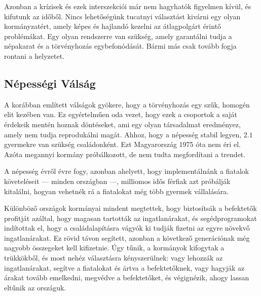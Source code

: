 Azonban a krízisek és ezek interszekciói már nem hagyhatók figyelmen kívül, és kifutunk az
időből. Nincs lehetőségünk tucatnyi választást kivárni egy olyan kormányzatért, amely
képes és hajlandó kezelni az átlagpolgárt érintő problémákat. Egy olyan rendszerre van
szükség, amely garantálni tudja a népakarat és a törvényhozás egybefonódását. Bármi
más csak tovább fogja rontani a helyzetet.


\subsection{Népességi Válság}

A korábban említett válságok gyökere, hogy a törvényhozás egy szűk, homogén elit
kezében van. Ez egyértelműen oda vezet, hogy ezek a csoportok a saját érdekeik mentén
hoznak döntéseket, ami egy olyan társadalmat eredményez, amely nem tudja reprodukálni
magát. Ahhoz, hogy a népesség stabil legyen, \(2.1\) gyermekre van szükség családonként.
Ezt Magyarország 1975 óta nem éri el. Azóta megannyi kormány próbálkozott, de nem tudta
megfordítani a trendet.

A népesség évről évre fogy, azonban ahelyett, hogy implementálnánk a fiatalok követeléseit
--- minden országban ---, milliomos idős férfiak azt próbálják kitalálni, hogyan vehetnék
rá a fiatalokat még több gyermek vállalására.

Különböző országok kormányai mindent megtettek, hogy biztosítsák a befektetők profitját
azáltal, hogy magasan tartották az ingatlanárakat, és segédprogramokat indítottak el,
hogy a családalapításra vágyók ki tudják fizetni az egyre növekvő ingatlanárakat. Ez
rövid távon segített, azonban a következő generációnak még nagyobb összegeket kell
kifizetnie. Úgy tűnik, a kormányok kifogytak a trükkökből, és most nehéz választásra
kényszerülnek: vagy lehozzák az ingatlanárakat, segítve a fiatalokat és ártva a
befektetőknek, vagy hagyják az árakat tovább emelkedni, megvédve a befektetőket, és
végignézik, ahogy lassan eltűnik az országuk.



